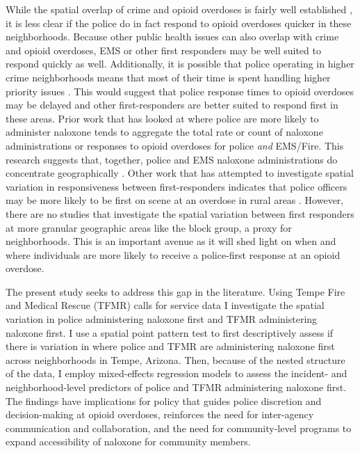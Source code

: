 While the spatial overlap of crime and opioid overdoses is fairly well established \parencite{carter_spatial_2019, magee_dual_2022}, it is less clear if the police do in fact respond to opioid overdoses quicker in these neighborhoods. Because other public health issues can also overlap with crime and opioid overdoses, EMS or other first responders may be well suited to respond quickly as well. Additionally, it is possible that police operating in higher crime neighborhoods means that most of their time is spent handling higher priority issues \parencite{klinger_negotiating_1997}. This would suggest that police response times to opioid overdoses may be delayed and other first-responders are better suited to respond first in these areas. Prior work that has looked at where police are more likely to administer naloxone tends to aggregate the total rate or count of naloxone administrations or responses to opioid overdoses for police \textit{and} EMS/Fire. This research suggests that, together, police and EMS naloxone administrations do concentrate geographically \parencite{heavey_descriptive_2018}. Other work that has attempted to investigate spatial variation in responsiveness between first-responders indicates that police officers may be more likely to be first on scene at an overdose in rural areas \parencite{wood_overdose_2021}. However, there are no studies that investigate the spatial variation between first responders at more granular geographic areas like the block group, a proxy for neighborhoods. This is an important avenue as it will shed light on when and where individuals are more likely to receive a police-first response at an opioid overdose.

The present study seeks to address this gap in the literature. Using Tempe Fire and Medical Rescue (TFMR) calls for service data I investigate the spatial variation in police administering naloxone first and TFMR administering naloxone first. I use a spatial point pattern test to first descriptively assess if there is variation in where police and TFMR are administering naloxone first across neighborhoods in Tempe, Arizona. Then, because of the nested structure of the data, I employ mixed-effects regression models to assess the incident- and neighborhood-level predictors of police and TFMR administering naloxone first. The findings have implications for policy that guides police discretion and decision-making at opioid overdoses, reinforces the need for inter-agency communication and collaboration, and the need for community-level programs to expand accessibility of naloxone for community members.

